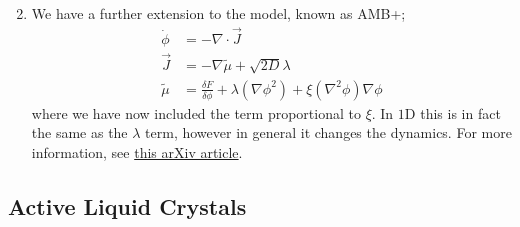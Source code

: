 \begin{enumerate}
\begin{equation*}
\end{equation*}
\item We have a further extension to the model, known as AMB+;
\begin{align*}
\dot{\phi} &= - \nabla \cdot \vec{J} \\
\vec{J} &= -\nabla \tilde{\mu} + \sqrt{2D}\lambda \\
\tilde{\mu} &= \frac{\delta F}{\delta \phi} + \lambda (\nabla \phi^2) + \xi (\nabla^2 \phi) \nabla \phi
\end{align*}
where we have now included the term proportional to $\xi$. In $1$D this is in fact the same as the $\lambda$ term, however in general it changes the dynamics. For more information, see \href{https://arxiv.org/pdf/1801.07687.pdf}{this arXiv article}.
\end{enumerate}
\subsection{Active Liquid Crystals}
